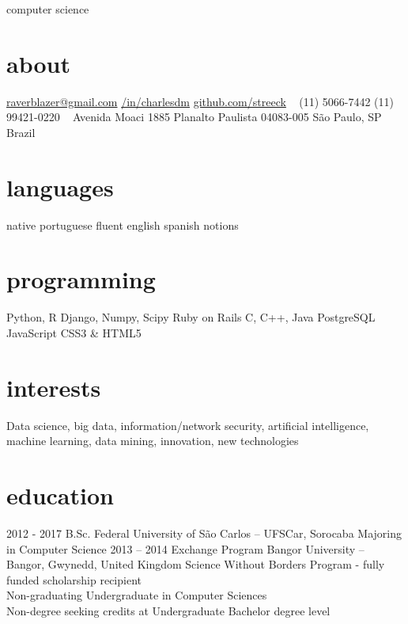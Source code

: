 \documentclass[]{friggeri-cv}
\begin{document}
       {computer science}


\begin{aside}
  \section{about}
    \href{mailto:raverblazer@gmail.com}{raverblazer@gmail.com}
    \href{http://www.linkedin.com/in/charlesdm}{\faLinkedinSign \space  /in/charlesdm}
    \href{https://github.com/streeck}{\faGithubSign \space github.com/streeck}
    ~
    (11) 5066-7442
    (11) 99421-0220
    ~
    Avenida Moaci 1885
    Planalto Paulista
    04083-005
    São Paulo, SP
    Brazil
  \section{languages}
    native portuguese
    fluent english
    spanish notions
  \section{programming}
    Python, R
    Django, Numpy, Scipy
    Ruby on Rails
    C, C++, Java
    PostgreSQL
    JavaScript
    CSS3 \& HTML5
\end{aside}

\section{interests}

Data science, big data, information/network security, artificial intelligence, machine learning, data mining, innovation, new technologies

\section{education}

\begin{entrylist}
  \entry
    {2012 - 2017}
    {B.Sc.}
    {Federal University of São Carlos -- UFSCar, Sorocaba}
    {Majoring in Computer Science}
  \entry
    {2013 – 2014}
    {Exchange Program}
    {Bangor University -- Bangor, Gwynedd, United Kingdom}
    {Science Without Borders Program - fully funded scholarship recipient \\
    Non-graduating Undergraduate in Computer Sciences \\
    Non-degree seeking credits at Undergraduate Bachelor degree level}
\end{entrylist}
\end{document}
